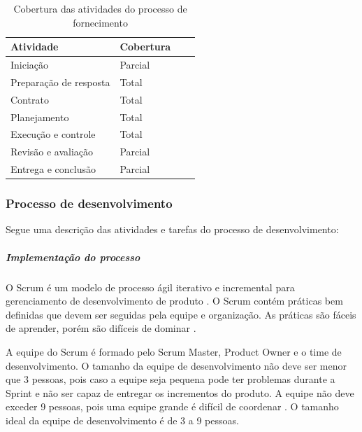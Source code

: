     \begin{table}[htb]
      \begin{center}
        \begin{tabular}{| l | l | l | l |}
        \hline
        \textbf{Atividade} & \textbf{Cobertura} \\ \hline
        Iniciação & Parcial \\ \hline
        Preparação de resposta & Total \\ \hline
        Contrato & Total \\ \hline
        Planejamento & Total \\ \hline
        Execução e controle & Total \\ \hline
        Revisão e avaliação & Parcial \\ \hline
        Entrega e conclusão & Parcial \\ \hline
        \end{tabular}
      \end{center}
    \caption{Cobertura das atividades do processo de fornecimento}
    \end{table}



\subsubsection{\large{Processo de desenvolvimento}}
\label{sec:desenvolvimento}

Segue uma descrição das atividades e tarefas do processo de desenvolvimento:

\subparagraph{Implementação do processo}

O Scrum é um modelo de processo ágil iterativo e incremental para gerenciamento de desenvolvimento de produto \cite{scrumwiki:17}. O Scrum contém práticas bem definidas que devem ser seguidas pela equipe e organização. As práticas são fáceis de aprender, porém são difíceis de dominar \cite{Schw01a}. 

A equipe do Scrum é formado pelo Scrum Master, Product Owner e o time de desenvolvimento. O tamanho da equipe de desenvolvimento não deve ser menor que 3 pessoas, pois caso a equipe seja pequena pode ter problemas durante a Sprint e não ser capaz de entregar os incrementos do produto. A equipe não deve exceder 9 pessoas, pois uma equipe grande é difícil de coordenar \cite{Schw01a}. O tamanho ideal da equipe de desenvolvimento é de 3 a 9 pessoas.

